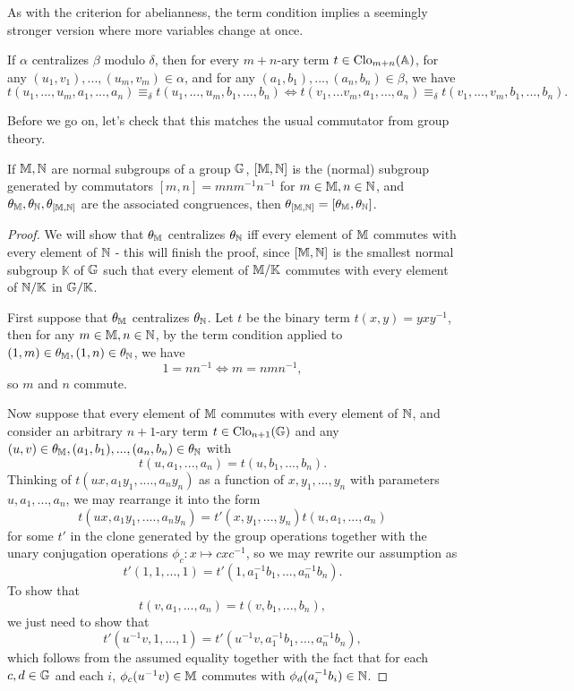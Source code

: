 \documentclass[letterpaper,11pt]{article}
\DeclareMathOperator{\Clo}{Clo}
\begin{document}
As with the criterion for abelianness, the term condition implies a seemingly stronger version where more variables change at once.

\begin{prop} If $\alpha$ centralizes $\beta$ modulo $\delta$, then for every $m+n$-ary term $t \in \Clo_{m+n}(\bA)$, for any $(u_1,v_1), ..., (u_m,v_m) \in \alpha$, and for any $(a_1,b_1), ..., (a_n,b_n) \in \beta$, we have
\[
t(u_1,...,u_m,a_1, ..., a_n) \equiv_\delta t(u_1,...,u_m,b_1, ..., b_n) \iff t(v_1,...v_m,a_1,...,a_n) \equiv_\delta t(v_1,...,v_m,b_1,...,b_n).
\]
\end{prop}

Before we go on, let's check that this matches the usual commutator from group theory.

\begin{prop} If $\mathbb{M},\mathbb{N}$ are normal subgroups of a group $\mathbb{G}$, $[\mathbb{M},\mathbb{N}]$ is the (normal) subgroup generated by commutators $[m,n] = mnm^{-1}n^{-1}$ for $m \in \mathbb{M}, n \in \mathbb{N}$, and $\theta_{\mathbb{M}}, \theta_{\mathbb{N}}, \theta_{[\mathbb{M},\mathbb{N}]}$ are the associated congruences, then $\theta_{[\mathbb{M},\mathbb{N}]} = [\theta_{\mathbb{M}},\theta_{\mathbb{N}}]$.
\end{prop}
\begin{proof} We will show that $\theta_{\mathbb{M}}$ centralizes $\theta_{\mathbb{N}}$ iff every element of $\mathbb{M}$ commutes with every element of $\mathbb{N}$ - this will finish the proof, since $[\mathbb{M},\mathbb{N}]$ is the smallest normal subgroup $\mathbb{K}$ of $\mathbb{G}$ such that every element of $\mathbb{M}/\mathbb{K}$ commutes with every element of $\mathbb{N}/\mathbb{K}$ in $\mathbb{G}/\mathbb{K}$.

First suppose that $\theta_{\mathbb{M}}$ centralizes $\theta_{\mathbb{N}}$. Let $t$ be the binary term $t(x,y) = yxy^{-1}$, then for any $m\in\mathbb{M}, n\in\mathbb{N}$, by the term condition applied to $(1,m) \in \theta_{\mathbb{M}}, (1,n) \in \theta_{\mathbb{N}}$, we have
\[
1 = nn^{-1} \iff m = nmn^{-1},
\]
so $m$ and $n$ commute.

Now suppose that every element of $\mathbb{M}$ commutes with every element of $\mathbb{N}$, and consider an arbitrary $n+1$-ary term $t \in \Clo_{n+1}(\bG)$ and any $(u,v) \in \theta_{\mathbb{M}}, (a_1,b_1), ..., (a_n,b_n) \in \theta_{\mathbb{N}}$ with
\[
t(u,a_1,...,a_n) = t(u,b_1,...,b_n).
\]
Thinking of $t(ux,a_1y_1,....,a_ny_n)$ as a function of $x,y_1,...,y_n$ with parameters $u,a_1,...,a_n$, we may rearrange it into the form
\[
t(ux,a_1y_1,....,a_ny_n) = t'(x,y_1,...,y_n)t(u,a_1,...,a_n)
\]
for some $t'$ in the clone generated by the group operations together with the unary conjugation operations $\phi_c: x \mapsto cxc^{-1}$, so we may rewrite our assumption as
\[
t'(1,1,...,1) = t'(1,a_1^{-1}b_1,...,a_n^{-1}b_n).
\]
To show that
\[
t(v,a_1,...,a_n) = t(v,b_1,...,b_n),
\]
we just need to show that
\[
t'(u^{-1}v,1,...,1) = t'(u^{-1}v,a_1^{-1}b_1,...,a_n^{-1}b_n),
\]
which follows from the assumed equality together with the fact that for each $c,d \in \mathbb{G}$ and each $i$, $\phi_c(u^{-1}v) \in \mathbb{M}$ commutes with $\phi_d(a_i^{-1}b_i) \in \mathbb{N}$.
\end{proof}
\end{document}
